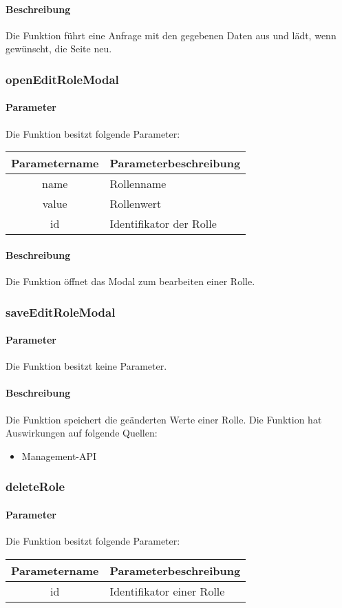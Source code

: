 \paragraph{Beschreibung} Die Funktion führt eine Anfrage mit den gegebenen Daten aus und lädt, wenn gewünscht, die Seite neu.
\subsubsection{openEditRoleModal}
\paragraph{Parameter} Die Funktion besitzt folgende Parameter:
\begin{table}[H]
	\begin{tabular}{|c|p{11cm}|}
		\hline
		\textbf{Parametername} & \textbf{Parameterbeschreibung} \\ \hline
		name  & Rollenname \\ \hline
		value & Rollenwert \\ \hline
		id    & Identifikator der Rolle \\ \hline
	\end{tabular}
\end{table}
\paragraph{Beschreibung} Die Funktion öffnet das Modal zum bearbeiten einer Rolle.
\subsubsection{saveEditRoleModal}
\paragraph{Parameter} Die Funktion besitzt keine Parameter.
\paragraph{Beschreibung} Die Funktion speichert die geänderten Werte einer Rolle. Die Funktion hat Auswirkungen auf folgende Quellen:
\begin{itemize}
	\item Management-API
\end{itemize}
\subsubsection{deleteRole}
\paragraph{Parameter} Die Funktion besitzt folgende Parameter:
\begin{table}[H]
	\begin{tabular}{|c|p{11cm}|}
		\hline
		\textbf{Parametername} & \textbf{Parameterbeschreibung} \\ \hline
		id & Identifikator einer Rolle \\ \hline
	\end{tabular}
\end{table}
